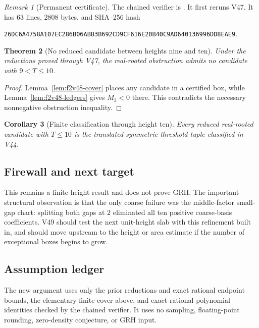 \documentclass[11pt]{article}
\newtheorem{theorem}{Theorem}[section]
\newtheorem{corollary}[theorem]{Corollary}
\theoremstyle{definition}
\theoremstyle{remark}
\newtheorem{remark}[theorem]{Remark}
\begin{document}
\begin{remark}[Permanent certificate]
\label{rem:f2v48-verifier}
The chained verifier is
.  It first reruns V47.
It has \(63\) lines, \(2808\) bytes, and SHA--256 hash
\begin{center}
\texttt{26DC6A4758A107EC286B06ABB3B692CD9CF616E20B40C9AD640136996DD8EAE9}.
\end{center}
\end{remark}

\begin{theorem}[No reduced candidate between heights nine and ten]
\label{thm:f2v48-nine-ten}
Under the reductions proved through V47, the real-rooted obstruction admits no
candidate with \(9<T\le10\).
\end{theorem}

\begin{proof}
Lemma~\ref{lem:f2v48-cover} places any candidate in a certified box, while
Lemma~\ref{lem:f2v48-ledgers} gives \(M_3<0\) there.  This contradicts the
necessary nonnegative obstruction inequality.
\end{proof}

\begin{corollary}[Finite classification through height ten]
\label{cor:f2v48-through-ten}
Every reduced real-rooted candidate with \(T\le10\) is the translated symmetric
threshold tuple classified in V44.
\end{corollary}

\subsection*{Firewall and next target}
\label{fire:f2v48}
This remains a finite-height result and does not prove GRH.  The important
structural observation is that the only coarse failure was the middle-factor
small-gap chart: splitting both gaps at \(2\) eliminated all ten positive
coarse-basis coefficients.  V49 should test the next unit-height slab with this
refinement built in, and should move upstream to the height or area estimate if
the number of exceptional boxes begins to grow.

\subsection*{Assumption ledger}
\label{ass:f2v48}
The new argument uses only the prior reductions and exact rational endpoint
bounds, the elementary finite cover above, and exact rational polynomial
identities checked by the chained verifier.  It uses no sampling, floating-point
rounding, zero-density conjecture, or GRH input.
\endgroup
\end{document}
